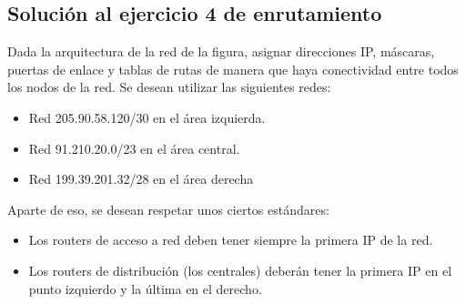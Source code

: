 \documentclass[letterpaper,10pt,spanish]{sphinxmanual}
\begin{document}
\subsection{Solución al ejercicio 4 de enrutamiento}
\label{\detokenize{t2_integracion_elementos/ejercicios_subredes_ipv4/ejercicios_dos_router:solucion-al-ejercicio-4-de-enrutamiento}}
\sphinxAtStartPar
Dada la arquitectura de la red de la figura, asignar direcciones IP, máscaras, puertas de enlace y tablas de rutas de manera que haya conectividad entre todos
los nodos de la red. Se desean utilizar las siguientes redes:
\begin{itemize}
\item {} 
\sphinxAtStartPar
Red 205.90.58.120/30 en el área izquierda.

\item {} 
\sphinxAtStartPar
Red 91.210.20.0/23 en el área central.

\item {} 
\sphinxAtStartPar
Red 199.39.201.32/28 en el área derecha

\end{itemize}

\begin{figure}[htbp]
\centering

\noindent{}
\end{figure}

\sphinxAtStartPar
Aparte de eso, se desean respetar unos ciertos estándares:
\begin{itemize}
\item {} 
\sphinxAtStartPar
Los routers de acceso a red deben tener siempre la primera IP de la red.

\item {} 
\sphinxAtStartPar
Los routers de distribución (los centrales) deberán tener la primera IP en el punto izquierdo y la última en el derecho.

\end{itemize}
\end{document}
